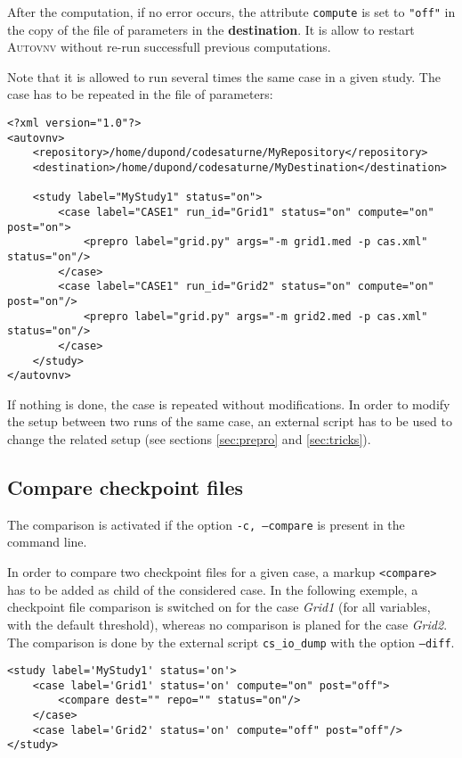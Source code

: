 \documentclass[a4paper,10pt,twoside]{csshortdoc}
\begin{document}
After the computation, if no error occurs, the attribute \texttt{compute} is set
to \texttt{"off"} in the copy of the file of parameters in the
\textbf{destination}. It is allow to restart \textsc{Autovnv} without re-run
successfull previous computations.

Note that it is allowed to run several times the same case in a given study.
The case has to be repeated in the file of parameters:

\small
\begin{verbatim}
<?xml version="1.0"?>
<autovnv>
    <repository>/home/dupond/codesaturne/MyRepository</repository>
    <destination>/home/dupond/codesaturne/MyDestination</destination>

    <study label="MyStudy1" status="on">
        <case label="CASE1" run_id="Grid1" status="on" compute="on" post="on">
            <prepro label="grid.py" args="-m grid1.med -p cas.xml" status="on"/>
        </case>
        <case label="CASE1" run_id="Grid2" status="on" compute="on" post="on"/>
            <prepro label="grid.py" args="-m grid2.med -p cas.xml" status="on"/>
        </case>
    </study>
</autovnv>
\end{verbatim}
\normalsize

If nothing is done, the case is repeated without modifications. In order to modify
the setup between two runs of the same case, an external script has to be used to
change the related setup (see sections \ref{sec:prepro} and \ref{sec:tricks}).

\subsection{Compare checkpoint files}

The comparison is activated if the option \texttt{-c, --compare} is present in
the command line.

In order to compare two checkpoint files for a given case, a markup
\texttt{<compare>} has to be added as child of the considered case.
In the following exemple, a checkpoint file comparison is switched on for the
case \textit{Grid1} (for all
variables, with the default threshold), whereas no comparison is planed for
the case \textit{Grid2}. The comparison is done by the external
script \texttt{cs\_io\_dump} with the option \texttt{--diff}.

\small
\begin{verbatim}
<study label='MyStudy1' status='on'>
    <case label='Grid1' status='on' compute="on" post="off">
        <compare dest="" repo="" status="on"/>
    </case>
    <case label='Grid2' status='on' compute="off" post="off"/>
</study>
\end{verbatim}
\normalsize
\end{document}
